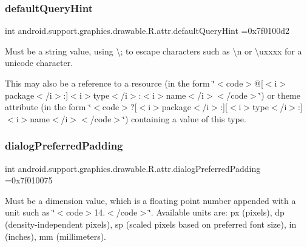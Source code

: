 \subsubsection{\texorpdfstring{default\+Query\+Hint}{defaultQueryHint}}
{\footnotesize\ttfamily int android.\+support.\+graphics.\+drawable.\+R.\+attr.\+default\+Query\+Hint =0x7f0100d2\hspace{0.3cm}{\ttfamily [static]}}

Must be a string value, using \textquotesingle{}\textbackslash{};\textquotesingle{} to escape characters such as \textquotesingle{}\textbackslash{}n\textquotesingle{} or \textquotesingle{}\textbackslash{}uxxxx\textquotesingle{} for a unicode character. 

This may also be a reference to a resource (in the form \char`\"{}$<$code$>$@\mbox{[}$<$i$>$package$<$/i$>$\+:\mbox{]}$<$i$>$type$<$/i$>$\+:$<$i$>$name$<$/i$>$$<$/code$>$\char`\"{}) or theme attribute (in the form \char`\"{}$<$code$>$?\mbox{[}$<$i$>$package$<$/i$>$\+:\mbox{]}\mbox{[}$<$i$>$type$<$/i$>$\+:\mbox{]}$<$i$>$name$<$/i$>$$<$/code$>$\char`\"{}) containing a value of this type. \mbox{\label{classandroid_1_1support_1_1graphics_1_1drawable_1_1R_1_1attr_a61c6d162e1c5d02dd124e15467059609}} 
\subsubsection{\texorpdfstring{dialog\+Preferred\+Padding}{dialogPreferredPadding}}
{\footnotesize\ttfamily int android.\+support.\+graphics.\+drawable.\+R.\+attr.\+dialog\+Preferred\+Padding =0x7f010075\hspace{0.3cm}{\ttfamily [static]}}

Must be a dimension value, which is a floating point number appended with a unit such as \char`\"{}$<$code$>$14.\+5sp$<$/code$>$\char`\"{}. Available units are\+: px (pixels), dp (density-\/independent pixels), sp (scaled pixels based on preferred font size), in (inches), mm (millimeters). 

